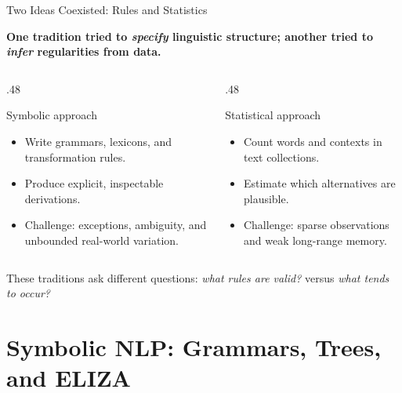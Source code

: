 \documentclass[aspectratio=169,10pt]{beamer}
\newcommand{\conceptlead}[1]{{\small\bfseries\color{CalPolyGreen}#1\par}}
\begin{document}
\begin{frame}{Two Ideas Coexisted: Rules and Statistics}
\small
\conceptlead{One tradition tried to \emph{specify} linguistic structure; another tried to \emph{infer} regularities from data.}
\begin{columns}[T,onlytextwidth]
\begin{column}{.48\textwidth}
\begin{block}{Symbolic approach}
\begin{itemize}
\item Write grammars, lexicons, and transformation rules.
\item Produce explicit, inspectable derivations.
\item Challenge: exceptions, ambiguity, and unbounded real-world variation.
\end{itemize}
\end{block}
\end{column}
\begin{column}{.48\textwidth}
\begin{block}{Statistical approach}
\begin{itemize}
\item Count words and contexts in text collections.
\item Estimate which alternatives are plausible.
\item Challenge: sparse observations and weak long-range memory.
\end{itemize}
\end{block}
\end{column}
\end{columns}
\begin{keyidea}These traditions ask different questions: \emph{what rules are valid?} versus \emph{what tends to occur?}\end{keyidea}
\end{frame}

\section{Symbolic NLP: Grammars, Trees, and ELIZA}
\end{document}
